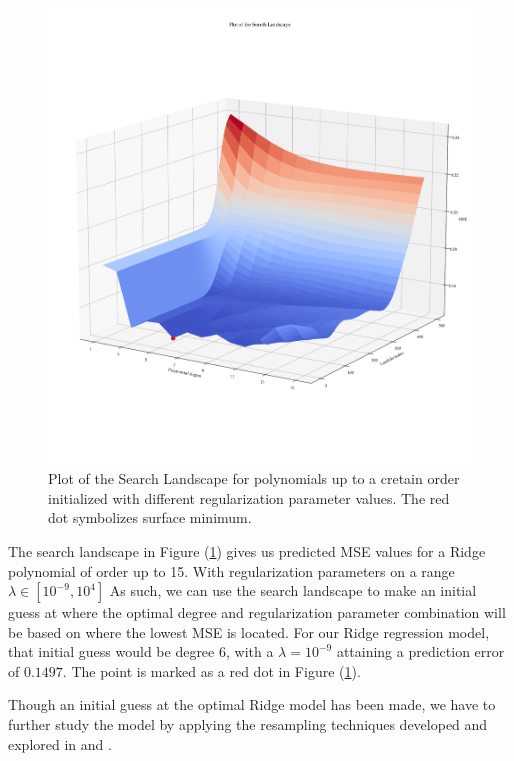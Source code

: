 \documentclass[11pt, a4paper]{article}
\begin{document}
\begin{figure}
  \centering
  \hspace*{-3.5cm}
  \includegraphics[scale=0.58]{figures/EX4_search_landscape_plt.pdf}
  \caption{\label{fig:ridge_search_land}Plot of the Search Landscape for polynomials up to a cretain order initialized with different regularization parameter values. The red dot symbolizes surface minimum.}
\end{figure}

The search landscape in Figure (\ref{fig:ridge_search_land}) gives us predicted MSE values for a Ridge polynomial of order up to 15. With regularization parameters on a range $\lambda \in \left[10^{-9},10^{4}\right]$ As such, we can use the search landscape to make an initial guess at where the optimal degree and regularization parameter combination will be based on where the lowest MSE is located. For our Ridge regression model, that initial guess would be degree 6, with a $\lambda = 10^{-9}$ attaining a prediction error of $0.1497$. The point is marked as a red dot in Figure (\ref{fig:ridge_search_land}).

Though an initial guess at the optimal Ridge model has been made, we have to further study the model by applying the resampling techniques developed and explored in  and .
\end{document}

